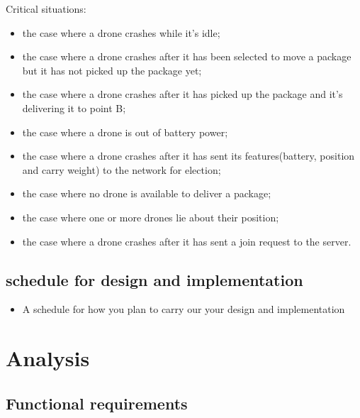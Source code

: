 \documentclass[a4paper, oneside]{memoir}
\begin{document}
Critical situations:
\begin{itemize}
	\item the case where a drone crashes while it's idle;
	\item the case where a drone crashes after it has been selected to move a package but it has not picked up the package yet;
	\item the case where a drone crashes after it has picked up the package and it's delivering it to point B;
	\item the case where a drone is out of battery power;
	\item the case where a drone crashes after it has sent its features(battery, position and carry weight) to the network for election;
	\item the case where no drone is available to deliver a package;
	\item the case where one or more drones lie about their position;
	\item the case where a drone crashes after it has sent a join request to the server.
\end{itemize}


\section{schedule for design and implementation}

\begin{itemize}
\item A schedule for how you plan to carry our your design and implementation
\end{itemize}




\chapter{Analysis}\label{ch:analysis}


\section{Functional requirements}

\end{document}
